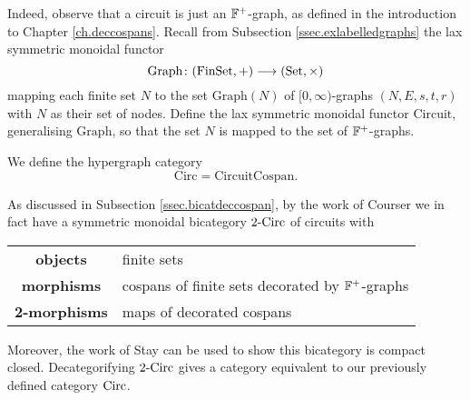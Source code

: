 Indeed, observe that a circuit is just an ${\mathbb F}^+$-graph, as defined in the
introduction to Chapter \ref{ch.deccospans}.  Recall from Subsection
\ref{ssec.exlabelledgraphs} the lax symmetric monoidal functor
\[
  \mathrm{Graph}{\colon} (\mathrm{FinSet},+) \longrightarrow (\mathrm{Set},\times)
\]
mapping each finite set $N$ to the set $\mathrm{Graph}(N)$ of
$[0,\infty)$-graphs $(N,E,s,t,r)$ with $N$ as their set of nodes. Define the lax
symmetric monoidal functor $\mathrm{Circuit}$, generalising $\mathrm{Graph}$,
so that the set $N$ is mapped to the set of ${\mathbb F}^+$-graphs.
  
\begin{definition}
  We define the hypergraph category
  \[
    \mathrm{Circ} = \mathrm{CircuitCospan} .
  \]
\end{definition}

\begin{aside}
  As discussed in Subsection \ref{ssec.bicatdeccospan}, by the work of Courser
  \cite{Cou16} we in fact have a symmetric monoidal bicategory $2\mbox{-}\mathrm{Circ}$
  of circuits with 
  \begin{center}
    \begin{tabular}{ c | p{} }
      \textbf{objects} & finite sets \\ 
      \textbf{morphisms} & cospans of finite sets decorated by ${\mathbb F}^+$-graphs \\ 
      \textbf{2-morphisms} & maps of decorated cospans \\
    \end{tabular}
  \end{center}
  Moreover, the work of Stay \cite{Sta16} can be used to show this bicategory is
  compact closed.  Decategorifying $2\mbox{-}\mathrm{Circ}$ gives a category equivalent
  to our previously defined category $\mathrm{Circ}$.
\end{aside}

